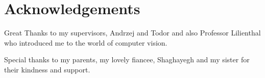 \cleardoublepage
{}
{}
\chapter*{Acknowledgements}

Great Thanks to my supervisors, Andrzej and Todor and also Professor Lilienthal who introduced me to the world of computer 
vision.

Special thanks to my parents, my lovely fiancee, Shaghayegh and my sister for their kindness and support. 

% 
